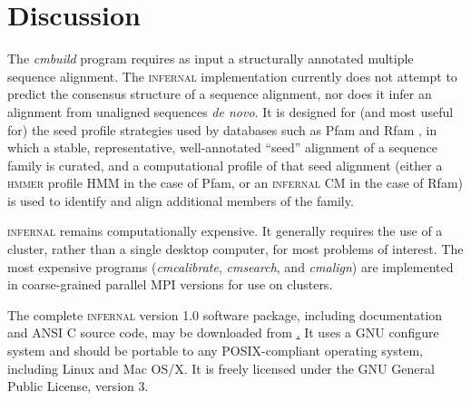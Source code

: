 \section{Discussion}

The \emph{cmbuild} program requires as input a structurally annotated
multiple sequence alignment. The \textsc{infernal} implementation
currently does not attempt to predict the consensus structure of a
sequence alignment, nor does it infer an alignment from unaligned
sequences \emph{de novo}. It is designed for (and most useful for) the
seed profile strategies used by databases such as Pfam and Rfam
\citep{Finn08,Gardner09}, in which a stable, representative,
well-annotated ``seed'' alignment of a sequence family is curated, and
a computational profile of that seed alignment (either a
\textsc{hmmer} profile HMM in the case of Pfam, or an
\textsc{infernal} CM in the case of Rfam) is used to identify and
align additional members of the family.

\textsc{infernal} remains computationally expensive. It generally
requires the use of a cluster, rather than a single desktop computer,
for most problems of interest. The most expensive programs
(\emph{cmcalibrate}, \emph{cmsearch}, and \emph{cmalign}) are
implemented in coarse-grained parallel MPI versions for use on
clusters. 

The complete \textsc{infernal} version 1.0 software package, including
documentation and ANSI C source code, may be downloaded from
\href{http://infernal.janelia.org}. It uses a GNU configure system and
should be portable to any POSIX-compliant operating system, including
Linux and Mac OS/X. It is freely licensed under the GNU General Public
License, version 3.
